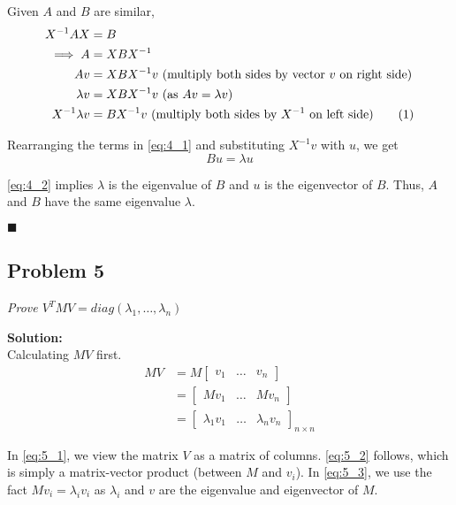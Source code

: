 \documentclass[12pt,a4paper]{article}
\newcommand\numberthis{\addtocounter{equation}{1}\tag{\theequation}}
\newcommand{\rightqed}{
\begin{flushright}
$\blacksquare$
\end{flushright}
}
\newcommand{\solution}{\noindent\textbf{Solution:}\\}
\begin{document}
Given $A$ and $B$ are similar,
\begin{align*}
    X^{-1}A{X} &= B \\
    \implies A &= XBX^{-1} \\
    Av &= XBX^{-1}v \text{ (multiply both sides by vector $v$ on right side)} \\
    \lambda v &= XBX^{-1}v \text{ (as $Av = \lambda v$)} \\
    X^{-1}\lambda v &= BX^{-1}v \text{ (multiply both sides by $X^{-1}$ on left side)} \numberthis \label{eq:4_1}
\end{align*}

Rearranging the terms in \eqref{eq:4_1} and substituting $X^{-1}v$ with $u$, we get
\begin{equation}
    Bu = \lambda u \label{eq:4_2}
\end{equation}

\eqref{eq:4_2} implies $\lambda$ is the eigenvalue of $B$ and $u$ is the eigenvector of $B$. Thus, $A$ and $B$ have the same eigenvalue $\lambda$.
\rightqed

\newpage
\subsection*{Problem 5}
\textit{
    Prove $V^TMV = diag(\lambda_1, \hdots, \lambda_n)$
}

\solution

Calculating $MV$ first.
\begin{align}
    MV &= M\begin{bmatrix}
        v_1 & \hdots & v_n
    \end{bmatrix} \label{eq:5_1} \\
    &= \begin{bmatrix}
        Mv_1 & \hdots & Mv_n
    \end{bmatrix} \label{eq:5_2} \\
    &= \begin{bmatrix}
        \lambda_1v_1 & \hdots & \lambda_nv_n
    \end{bmatrix}_{n \times n} \label{eq:5_3}
\end{align}

In \eqref{eq:5_1}, we view the matrix $V$ as a matrix of columns. \eqref{eq:5_2} follows, which is simply a matrix-vector product (between $M$ and $v_i$). In \eqref{eq:5_3}, we use the fact $Mv_i = \lambda_iv_i$ as $\lambda_i$ and $v$ are the eigenvalue and eigenvector of $M$.
\end{document}
